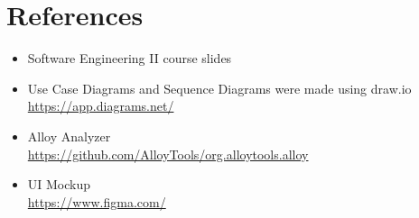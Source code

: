 \chapter{References}
\begin{itemize}
    \item Software Engineering II course slides
    \item Use Case Diagrams and Sequence Diagrams were made using draw.io\\ \url{https://app.diagrams.net/}
    \item Alloy Analyzer\\ \url{https://github.com/AlloyTools/org.alloytools.alloy}
    \item UI Mockup \\ \url{https://www.figma.com/}
\end{itemize}